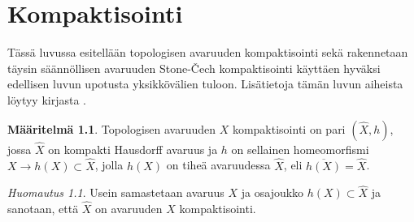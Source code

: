 \documentclass[12pt,a4paper,leqno]{report}
\theoremstyle{plain}
\theoremstyle{definition}
\newtheorem{maar}[equation]{Määritelmä}
\theoremstyle{remark}
\newtheorem{huom}[equation]{Huomautus}
\begin{document}
\chapter{Kompaktisointi}
Tässä luvussa esitellään topologisen avaruuden kompaktisointi sekä rakennetaan täysin säännöllisen avaruuden Stone-Čech kompaktisointi käyttäen hyväksi edellisen luvun upotusta yksikkövälien tuloon.
Lisätietoja tämän luvun aiheista löytyy kirjasta %
\cite{Dugu}.

\begin{maar}
Topologisen avaruuden $X$ kompaktisointi on pari $(\hat{X},h)$, 
jossa $\hat{X}$ on kompakti Hausdorff avaruus 
ja $h$ on sellainen homeomorfismi $X\rightarrow h(X)\subset\hat{X}$, 
jolla $h(X)$ on tiheä avaruudessa $\hat{X}$, eli $\overline{ h(X)}=\hat{X}$. 
\end{maar}
\begin{huom}
Usein samastetaan avaruus $X$ ja osajoukko $h(X)\subset\hat{X}$ ja sanotaan, 
että $\hat{X}$ on avaruuden $X$ kompaktisointi. 
\end{huom}
\end{document}
